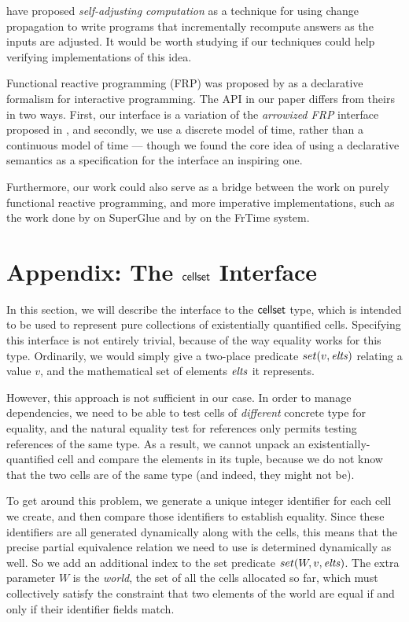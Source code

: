 \citet{self-adjusting} have proposed
\emph{self-adjusting computation} as a technique for using change
propagation to write programs that incrementally
recompute answers as the inputs are adjusted. It would be worth 
studying if our techniques could help verifying implementations of this
idea.

Functional reactive programming (FRP) was proposed by \citet{frp} as a
declarative formalism for interactive programming. The API in our
paper differs from theirs in two ways. First, our interface is a
variation of the \emph{arrowized FRP} interface proposed in
\cite{afrp}, and secondly, we use a discrete model of time, rather
than a continuous model of time --- though we found the core idea of
using a declarative semantics as a specification for the interface an
inspiring one.

Furthermore, our work could also serve as a bridge between the work on
purely functional reactive programming, and more imperative
implementations, such as the work done by \citet{superglue} on
SuperGlue and by \citet{frtime} on the FrTime system.


\section{Appendix: The $\mathsf{cellset}$ Interface}

In this section, we will describe the interface to the $\mathsf{cellset}$ type,
which is intended to be used to represent pure collections of
existentially quantified cells. Specifying this interface is not
entirely trivial, because of the way equality works for this
type. Ordinarily, we would simply give a two-place predicate $set(v,
\mathit{elts})$ relating a value $v$, and the mathematical set of elements
$\mathit{elts}$ it represents.

However, this approach is not sufficient in our case. In order to
manage dependencies, we need to be able to test cells of
\emph{different} concrete type for equality, and the natural equality
test for references only permits testing references of the same
type. As a result, we cannot unpack an existentially-quantified cell
and compare the elements in its tuple, because we do not know that the
two cells are of the same type (and indeed, they might not be).

To get around this problem, we generate a unique integer identifier
for each cell we create, and then compare those identifiers to
establish equality. Since these identifiers are all generated
dynamically along with the cells, this means that the precise partial
equivalence relation we need to use is determined dynamically as
well. So we add an additional index to the set predicate $set(W, v,
\mathit{elts})$. The extra parameter $W$ is the \emph{world}, the set of all
the cells allocated so far, which must collectively satisfy the
constraint that two elements of the world are equal if and only if their
identifier fields match.


